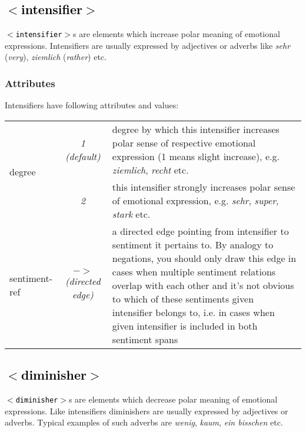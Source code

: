 \documentclass[11pt,a4paper]{article}
\newcommand{\xmltag}[1]{\textcolor{black}{{\small$<$#1$>$}}}
\begin{document}
\subsection{\xmltag{intensifier}}
\texttt{\xmltag{intensifier}}s are elements which increase polar
meaning of emotional expressions. Intensifiers are usually expressed
by adjectives or adverbs like \textit{sehr} (\textit{very}),
\textit{ziemlich} (\textit{rather}) etc.

\subsubsection{Attributes}
Intensifiers have following attributes and values:

\begin{tabular}{|l|c|p{}|}\hline
  \multirow{2}{*}{degree} & \textit{1 (default)} & degree by which
  this intensifier increases polar sense of respective emotional
  expression (1 means slight increase), e.g. \textit{ziemlich},
  \textit{recht} etc.\\\cline{2-3}

  & \textit{2} & this intensifier strongly increases polar sense of
  emotional expression, e.g. \textit{sehr}, \textit{super},
  \textit{stark} etc.\\\hline


  sentiment-ref & \textit{$->$\newline(directed edge)} & a directed
  edge pointing from intensifier to sentiment it pertains to. By
  analogy to negations, you should only draw this edge in cases when
  multiple sentiment relations overlap with each other and it's not
  obvious to which of these sentiments given intensifier belongs to,
  i.e. in cases when given intensifier is included in both sentiment
  spans\\\hline
\end{tabular}


\subsection{\xmltag{diminisher}}
\texttt{\xmltag{diminisher}}s are elements which decrease polar
meaning of emotional expressions. Like intensifiers diminishers are
usually expressed by adjectives or adverbs. Typical examples of such
adverbs are \textit{wenig}, \textit{kaum}, \textit{ein bisschen} etc.
\end{document}
